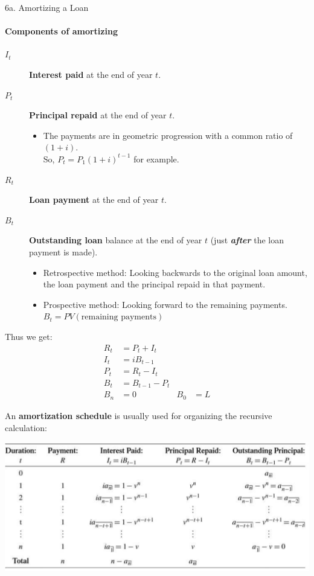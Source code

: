 \begin{CHPT_SUMM_AUTO}[label = {L.-6a}]{6a. Amortizing a Loan}
\paragraph{Components of amortizing}
\begin{description}
	\item[$I_{t}$]	\textbf{Interest paid} at the end of year $t$.
	\item[$P_{t}$]	\textbf{Principal repaid} at the end of year $t$.
		\begin{itemize}[leftmargin = *]
		\item	The payments are in geometric progression with a common ratio of $(1 + i)$.\\
				So, $P_{t} = P_{1} (1 + i)^{t - 1}$ for example.
		\end{itemize}
	\item[$R_{t}$]	\textbf{Loan payment} at the end of year $t$.
	\item[$B_{t}$]	\textbf{Outstanding loan} balance at the end of year $t$ (just \textbf{\textit{after}} the loan payment is made).
		\begin{itemize}[leftmargin = *]
		\item	Retrospective method: Looking backwards to the original loan amount, the loan payment and the principal repaid in that payment.
		\item	Prospective method: Looking forward to the remaining payments.\\
				$B_{t} = PV(\text{remaining payments})$
		\end{itemize}
\end{description}

Thus we get:
\begin{align*}
	R_{t}	&= 	P_{t} + I_{t}		\\
	I_{t}	&= 	iB_{t - 1}			\\
	P_{t}	&=	R_{t} - I_{t}		\\
	B_{t} 	&= 	B_{t - 1} - P_{t}	\\
	B_{n}	&=	0	&
	B_{0}	&=	L
\end{align*}

An \textbf{amortization schedule} is usually used for organizing the recursive calculation:
\begin{center}
	\includegraphics[scale=0.35]{img/amortization-schedule.png}
\end{center}


\end{CHPT_SUMM_AUTO}
